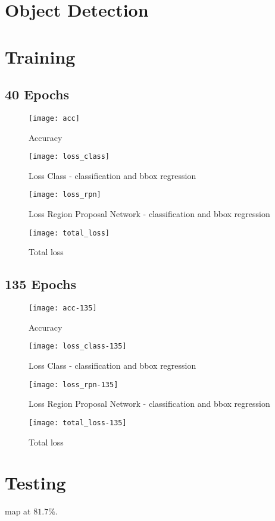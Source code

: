 \section{Object Detection}
\section{Training}



\subsection{40 Epochs}
\begin{figure}[H]
	\centering
	\texttt{[image: acc]}
	\caption{Accuracy}
	\label{fig:}
\end{figure}
\begin{figure}[H]
	\centering
	\texttt{[image: loss\_class]}
	\caption{Loss Class - classification and bbox regression}
	\label{fig:}
\end{figure}
\begin{figure}[H]
	\centering
	\texttt{[image: loss\_rpn]}
	\caption{Loss Region Proposal Network - classification and bbox regression}
	\label{fig:}
\end{figure}
\begin{figure}[H]
	\centering
	\texttt{[image: total\_loss]}
	\caption{Total loss}
	\label{fig:}
\end{figure}

\subsection{135 Epochs}
\begin{figure}[H]
	\centering
	\texttt{[image: acc-135]}
	\caption{Accuracy}
	\label{fig:}
\end{figure}
\begin{figure}[H]
	\centering
	\texttt{[image: loss\_class-135]}
	\caption{Loss Class - classification and bbox regression}
	\label{fig:}
\end{figure}
\begin{figure}[H]
	\centering
	\texttt{[image: loss\_rpn-135]}
	\caption{Loss Region Proposal Network - classification and bbox regression}
	\label{fig:}
\end{figure}
\begin{figure}[H]
	\centering
	\texttt{[image: total\_loss-135]}
	\caption{Total loss}
	\label{fig:}
\end{figure}


\section{Testing}
\gls{map} at $81.7\%$. 

%
